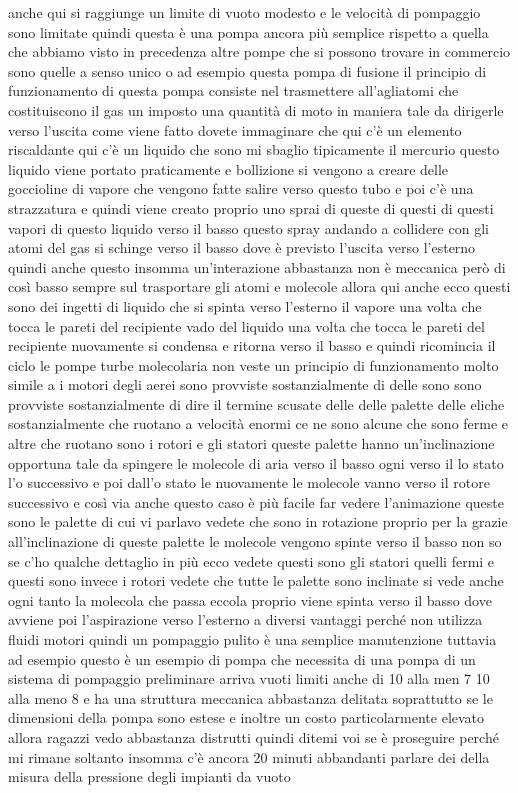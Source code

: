 anche qui si raggiunge un limite di vuoto modesto e le velocità di pompaggio sono limitate quindi questa è una pompa ancora più semplice rispetto a quella che abbiamo visto in precedenza altre pompe che si possono trovare in commercio sono quelle a senso unico o ad esempio questa pompa di fusione il principio di funzionamento di questa pompa consiste nel trasmettere all'agliatomi che costituiscono il gas un imposto una quantità di moto in maniera tale da dirigerle verso l'uscita come viene fatto dovete immaginare che qui c'è un elemento riscaldante qui c'è un liquido che sono mi sbaglio tipicamente il mercurio questo liquido viene portato praticamente e bollizione si vengono a creare delle goccioline di vapore che vengono fatte salire verso questo tubo e poi c'è una strazzatura e quindi viene creato proprio uno sprai di queste di questi di questi vapori di questo liquido verso il basso questo spray andando a collidere con gli atomi del gas si schinge verso il basso dove è previsto l'uscita verso l'esterno quindi anche questo insomma un'interazione abbastanza non è meccanica però di così basso sempre sul trasportare gli atomi e molecole allora qui anche ecco questi sono dei ingetti di liquido che si spinta verso l'esterno il vapore una volta che tocca le pareti del recipiente vado del liquido una volta che tocca le pareti del recipiente nuovamente si condensa e ritorna verso il basso e quindi ricomincia il ciclo le pompe turbe molecolaria non veste un principio di funzionamento molto simile a i motori degli aerei sono provviste sostanzialmente di delle sono sono provviste sostanzialmente di dire il termine scusate delle delle palette delle eliche sostanzialmente che ruotano a velocità enormi ce ne sono alcune che sono ferme e altre che ruotano sono i rotori e gli statori queste palette hanno un'inclinazione opportuna tale da spingere le molecole di aria verso il basso ogni verso il lo stato l'o successivo e poi dall'o stato le nuovamente le molecole vanno verso il rotore successivo e così via anche questo caso è più facile far vedere l'animazione queste sono le palette di cui vi parlavo vedete che sono in rotazione proprio per la grazie all'inclinazione di queste palette le molecole vengono spinte verso il basso non so se c'ho qualche dettaglio in più ecco vedete questi sono gli statori quelli fermi e questi sono invece i rotori vedete che tutte le palette sono inclinate si vede anche ogni tanto la molecola che passa eccola proprio viene spinta verso il basso dove avviene poi l'aspirazione verso l'esterno a diversi vantaggi perché non utilizza fluidi motori quindi un pompaggio pulito è una semplice manutenzione tuttavia ad esempio questo è un esempio di pompa che necessita di una pompa di un sistema di pompaggio preliminare arriva vuoti limiti anche di 10 alla men 7 10 alla meno 8 e ha una struttura meccanica abbastanza delitata soprattutto se le dimensioni della pompa sono estese e inoltre un costo particolarmente elevato allora ragazzi vedo abbastanza distrutti quindi ditemi voi se è proseguire perché mi rimane soltanto insomma c'è ancora 20 minuti abbandanti parlare dei della misura della pressione degli impianti da vuoto

